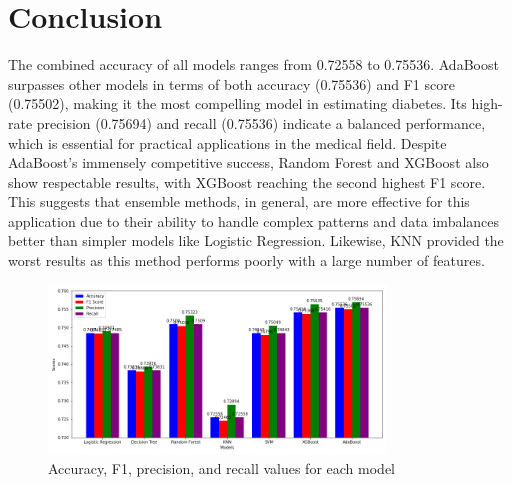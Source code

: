 \documentclass[12pt]{article}
\begin{document}
\section{Conclusion}
The combined accuracy of all models ranges from 0.72558 to 0.75536. AdaBoost surpasses other models in terms of both accuracy (0.75536) and F1 score (0.75502), making it the most compelling model in estimating diabetes. Its high-rate precision (0.75694) and recall (0.75536) indicate a balanced performance, which is essential for practical applications in the medical field. Despite AdaBoost's immensely competitive success, Random Forest and XGBoost also show respectable results, with XGBoost reaching the second highest F1 score. This suggests that ensemble methods, in general, are more effective for this application due to their ability to handle complex patterns and data imbalances better than simpler models like Logistic Regression. Likewise, KNN provided the worst results as this method performs poorly with a large number of features.
\begin{figure}[H]
  \centering
  \includegraphics[width=0.8\textwidth]{combined.png}
  \caption{Accuracy, F1, precision, and recall values for each model}
  \label{fig:14}
\end{figure}
\end{document}
